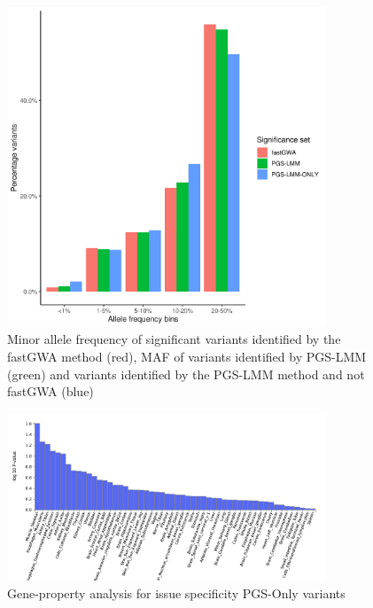 \documentclass{article}
\begin{document}
\begin{figure}[h!]
  \includegraphics[width=0.85\textwidth]{images/SFig3.png}
  \caption[MAF plot]{Minor allele frequency of significant variants identified by the fastGWA method (red), MAF of variants identified by PGS-LMM (green) and variants identified by the PGS-LMM method and not fastGWA (blue)}
\end{figure}

\begin{figure}[h!]
  \includegraphics[width=0.85\textwidth]{images/SFig4.png}
  \caption{Gene-property analysis for issue specificity PGS-Only variants}
\end{figure}
\end{document}
